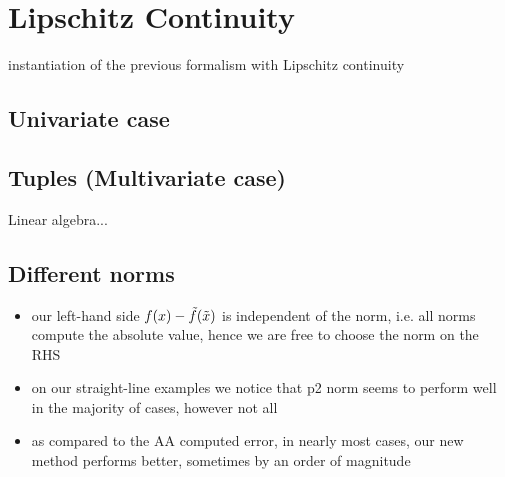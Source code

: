 \section{Lipschitz Continuity}

instantiation of the previous formalism with Lipschitz continuity

\subsection{Univariate case}


\subsection{Tuples (Multivariate case)}

Linear algebra...


\subsection{Different norms}
\begin{itemize}
\item our left-hand side $f(x) - \tilde{f}(\tilde{x})$ is independent of the norm, i.e. all norms compute the absolute value,
hence we are free to choose the norm on the RHS
\item on our straight-line examples we notice that p2 norm seems to perform well in the majority of cases, however not all

\item as compared to the AA computed error, in nearly most cases, our new method performs better, sometimes by
an order of magnitude
\end{itemize}